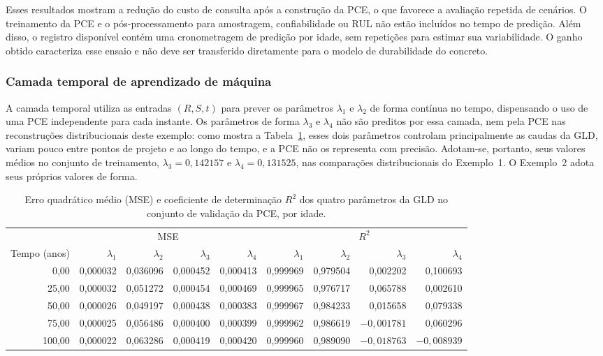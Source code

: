 Esses resultados mostram a redução do custo de consulta após a construção da PCE, o que favorece a avaliação repetida de cenários. O treinamento da PCE e o pós-processamento para amostragem, confiabilidade ou RUL não estão incluídos no tempo de predição. Além disso, o registro disponível contém uma cronometragem de predição por idade, sem repetições para estimar sua variabilidade. O ganho obtido caracteriza esse ensaio e não deve ser transferido diretamente para o modelo de durabilidade do concreto.

\subsubsection{Camada temporal de aprendizado de máquina}
\label{subsub:camada_temporal}

A camada temporal utiliza as entradas $(R,S,t)$ para prever os parâmetros $\lambda_1$ e $\lambda_2$ de forma contínua no tempo, dispensando o uso de uma PCE independente para cada instante. Os parâmetros de forma $\lambda_3$ e $\lambda_4$ não são preditos por essa camada, nem pela PCE nas reconstruções distribucionais deste exemplo: como mostra a Tabela~\ref{tab:validation_results}, esses dois parâmetros controlam principalmente as caudas da GLD, variam pouco entre pontos de projeto e ao longo do tempo, e a PCE não os representa com precisão. Adotam-se, portanto, seus valores médios no conjunto de treinamento, $\lambda_3=0{,}142157$ e $\lambda_4=0{,}131525$, nas comparações distribucionais do Exemplo~1. O Exemplo~2 adota seus próprios valores de forma.

\begin{table}[H]
\centering
\caption{Erro quadrático médio (MSE) e coeficiente de determinação $R^2$ dos quatro parâmetros da GLD no conjunto de validação da PCE, por idade.}
\label{tab:validation_results}
\footnotesize
\setlength{\tabcolsep}{4pt}
\begin{tabular}{rrrrrrrrr}
\toprule
 & \multicolumn{4}{c}{MSE} & \multicolumn{4}{c}{$R^2$} \\
\cmidrule(lr){2-5}\cmidrule(lr){6-9}
Tempo (anos) & $\lambda_1$ & $\lambda_2$ & $\lambda_3$ & $\lambda_4$ & $\lambda_1$ & $\lambda_2$ & $\lambda_3$ & $\lambda_4$ \\
\midrule
0,00   & 0,000032 & 0,036096 & 0,000452 & 0,000413 & 0,999969 & 0,979504 & 0,002202      & 0,100693 \\
25,00  & 0,000032 & 0,051272 & 0,000454 & 0,000469 & 0,999965 & 0,976717 & 0,065788      & 0,002610 \\
50,00  & 0,000026 & 0,049197 & 0,000438 & 0,000383 & 0,999967 & 0,984233 & 0,015658      & 0,079338 \\
75,00  & 0,000025 & 0,056486 & 0,000400 & 0,000399 & 0,999962 & 0,986619 & $-0{,}001781$ & 0,060296 \\
100,00 & 0,000022 & 0,063286 & 0,000419 & 0,000420 & 0,999960 & 0,989090 & $-0{,}018763$ & $-0{,}008939$ \\
\bottomrule
\end{tabular}
\end{table}

